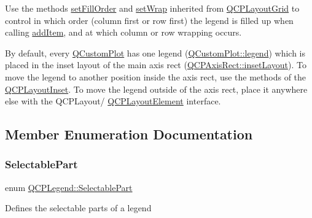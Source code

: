 Use the methods \mbox{\hyperlink{class_q_c_p_layout_grid_affc2f3cfd22f28698c5b29b960d2a391}{set\+Fill\+Order}} and \mbox{\hyperlink{class_q_c_p_layout_grid_ab36af18d77e4428386d02970382ee598}{set\+Wrap}} inherited from \mbox{\hyperlink{class_q_c_p_layout_grid}{Q\+C\+P\+Layout\+Grid}} to control in which order (column first or row first) the legend is filled up when calling \mbox{\hyperlink{class_q_c_p_legend_a3ab274de52d2951faea45a6d975e6b3f}{add\+Item}}, and at which column or row wrapping occurs.

By default, every \mbox{\hyperlink{class_q_custom_plot}{Q\+Custom\+Plot}} has one legend (\mbox{\hyperlink{class_q_custom_plot_a4eadcd237dc6a09938b68b16877fa6af}{Q\+Custom\+Plot\+::legend}}) which is placed in the inset layout of the main axis rect (\mbox{\hyperlink{class_q_c_p_axis_rect_a949f803466619924c7018df4b511ae10}{Q\+C\+P\+Axis\+Rect\+::inset\+Layout}}). To move the legend to another position inside the axis rect, use the methods of the \mbox{\hyperlink{class_q_c_p_layout_inset}{Q\+C\+P\+Layout\+Inset}}. To move the legend outside of the axis rect, place it anywhere else with the Q\+C\+P\+Layout/ \mbox{\hyperlink{class_q_c_p_layout_element}{Q\+C\+P\+Layout\+Element}} interface. 

\subsection{Member Enumeration Documentation}
\mbox{\label{class_q_c_p_legend_a5404de8bc1e4a994ca4ae69e2c7072f1}} 
\subsubsection{\texorpdfstring{SelectablePart}{SelectablePart}}
{\footnotesize\ttfamily enum \mbox{\hyperlink{class_q_c_p_legend_a5404de8bc1e4a994ca4ae69e2c7072f1}{Q\+C\+P\+Legend\+::\+Selectable\+Part}}}

Defines the selectable parts of a legend

